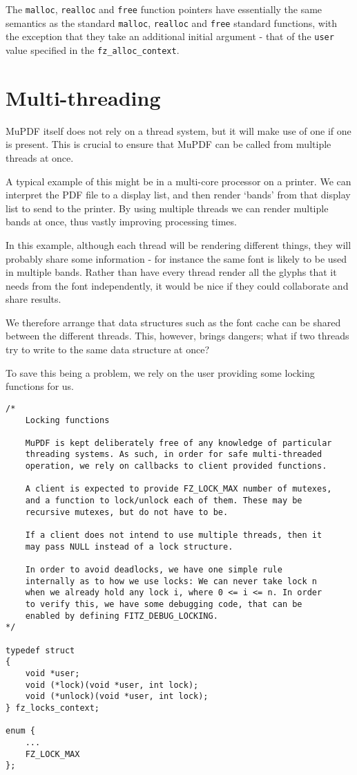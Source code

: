 \documentclass[oneside]{book}
\begin{document}
The \texttt{malloc}, \texttt{realloc} and \texttt{free} function pointers have essentially the same semantics as the standard \texttt{malloc}, \texttt{realloc} and \texttt{free} standard functions, with the exception that they take an additional initial argument - that of the \texttt{user} value specified in the  \texttt{fz\_alloc\_context}.


\section{Multi-threading}
\label{MultiThreading}

MuPDF itself does not rely on a thread system, but it will make use of one if one is present. This is crucial to ensure that MuPDF can be called from multiple threads at once.

A typical example of this might be in a multi-core processor on a printer. We can  interpret the PDF file to a display list, and then render `bands' from that display list to send to the printer. By using multiple threads we can render multiple bands at once, thus vastly improving processing times.

In this example, although each thread will be rendering different things, they will probably share some information - for instance the same font is likely to be used in multiple bands. Rather than have every thread render all the glyphs that it needs from the font independently, it would be nice if they could collaborate and share results.

We therefore arrange that data structures such as the font cache can be shared between the different threads. This, however, brings dangers; what if two threads try to write to the same data structure at once?

To save this being a problem, we rely on the user providing some locking functions for us.

\begin{lstlisting}
/*
	Locking functions

	MuPDF is kept deliberately free of any knowledge of particular
	threading systems. As such, in order for safe multi-threaded
	operation, we rely on callbacks to client provided functions.

	A client is expected to provide FZ_LOCK_MAX number of mutexes,
	and a function to lock/unlock each of them. These may be
	recursive mutexes, but do not have to be.

	If a client does not intend to use multiple threads, then it
	may pass NULL instead of a lock structure.

	In order to avoid deadlocks, we have one simple rule
	internally as to how we use locks: We can never take lock n
	when we already hold any lock i, where 0 <= i <= n. In order
	to verify this, we have some debugging code, that can be
	enabled by defining FITZ_DEBUG_LOCKING.
*/

typedef struct
{
	void *user;
	void (*lock)(void *user, int lock);
	void (*unlock)(void *user, int lock);
} fz_locks_context;

enum {
    ...
	FZ_LOCK_MAX
};
\end{lstlisting}
\end{document}
